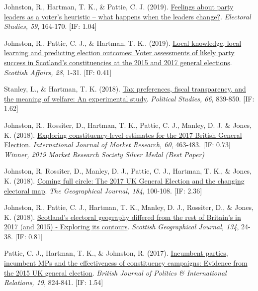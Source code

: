 \documentclass[12pt]{article}
\begin{document}
\begin{bibenum}
    \item Johnston, R., {Hartman, T. K.}, \& Pattie, C. J. (2019). 
    		\href{https://10.1016/j.electstud.2018.12.005}
    		{Feelings about party leaders as a voter's heuristic -- 
    		what happens when the leaders change?}.
        \emph{Electoral Studies, 59}, 164-170. [IF: 1.04]
          
	\item Johnston, R., Pattie, C. J., \& {Hartman, T. K.}. (2019). 
		\href{https://10.3366/scot.2019.0263}
		{Local knowledge, local learning and predicting election outcomes: 
		Voter assessments of likely party success in Scotland's constituencies 
		at the 2015 and 2017 general elections}.
		\emph{Scottish Affairs, 28}, 1-31. [IF: 0.41]
		
	\item Stanley, L., \& {Hartman, T. K.} (2018).
          \href{https://10.1177/0032321717731661}
          {Tax preferences, fiscal transparency, and the meaning of welfare: 
          An experimental study}. 
          \emph{Political Studies, 66}, 839-850. [IF: 1.62]
          
	\item Johnston, R., Rossiter, D., {Hartman, T. K.}, Pattie, C. J., 
		   Manley, D. J. \&  Jones, K. (2018). 
		  \href{https://10.1177/1470785318778247}
		  {Exploring constituency-level estimates for the 2017 British General Election}.
		  \emph{International Journal of Market Research, 60}, 463-483. [IF: 0.73]\\
		  \textit{Winner, 2019 Market Research Society Silver Medal (Best Paper)}

	\item Johnston, R, Rossiter, D., Manley, D. J., Pattie, C. J., 
		  {Hartman, T. K.}, \& Jones, K. (2018).
		  \href{https://10.1111/geoj.12240}
		  {Coming full circle: 
		  The 2017 UK General Election and the changing electoral map}. 
		  \emph{The Geographical Journal, 184}, 100-108. [IF: 2.36]
          
	\item Johnston, R., Pattie, C. J., {Hartman, T. K.}, Manley, D. J., 
		  Rossiter, D., \& Jones, K. (2018).
		  \href{https://10.1080/14702541.2017.1409362}
		  {Scotland's electoral geography 
		  differed from the rest of Britain's in 2017 (and 2015) - 
		  Exploring its contours}. 
		  \emph{Scottish Geographical Journal, 134}, 24-38. [IF: 0.81]
          
    \item Pattie, C. J., {Hartman, T. K.}, \& Johnston, R. (2017).
          \href{https://10.1177/1369148117718710}
          {Incumbent parties, incumbent MPs and the effectiveness of 
          constituency campaigns: Evidence from the 2015 UK general election}.
           \emph{British Journal of Politics \& International Relations, 19}, 824-841. [IF: 1.54]
          

\end{bibenum}
\end{document}

